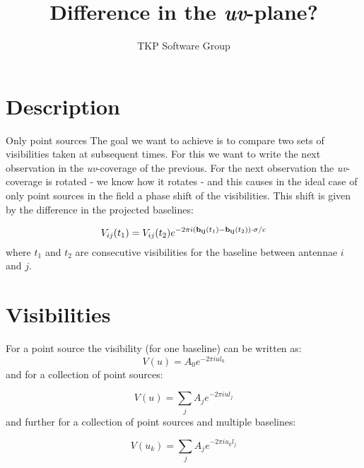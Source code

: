 \documentclass{article}
\begin{document}
\title{Difference in the {\it uv}-plane?}
\author{TKP Software Group}
\maketitle

\section{Description}
Only point sources
The goal we want to achieve is to compare two sets of visibilities taken at subsequent times. 
For this we want to write the next observation in the {\it uv}-coverage of the previous.
For the next observation the {\it uv}-coverage is rotated - we know how it rotates - and this causes in the ideal case of only point sources in the field a phase shift of the visibilities. This shift is given by the difference in the projected baselines:

\begin{equation}
V_{ij}(t_{1}) = V_{ij}(t_{2}) e^{-2 \pi i ({\bf b_{ij}}(t_{1}) - {\bf b_{ij}}(t_{2})) \cdot {\bf \sigma} / c}
\end{equation}
where $t_{1}$ and $t_{2}$ are consecutive visibilities for the baseline between antennae $i$ and $j$.

\section{Visibilities}
For a point source the visibility (for one baseline) can be written as:
\begin{equation}
V(u) = A_{0} e^{-2 \pi i u l_{0}}
\end{equation}
and for a collection of point sources:

\begin{equation}
V(u) = \sum_{j} A_{j} e^{-2 \pi i u l_{j}}
\end{equation}
and further for a collection of point sources and multiple baselines:

\begin{equation}
V(u_{k}) = \sum_{j} A_{j} e^{-2 \pi i u_{k} l_{j}}
\end{equation}
\end{document}
